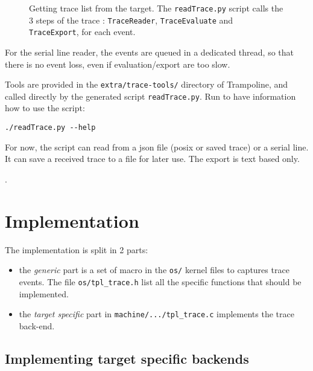 \begin{figure}[htbp]
    \centering
	\begin{adjustbox}{width=.7\linewidth,keepaspectratio}
		
	\end{adjustbox}
	\caption{Getting trace list from the target. The \lstinline{readTrace.py} script calls the 3 steps of the trace : \lstinline{TraceReader}, \lstinline{TraceEvaluate} and \lstinline{TraceExport}, for each event.}
	\label{fig:trace}
\end{figure}

For the serial line reader, the events are queued in a dedicated thread, so that there is no event loss, even if evaluation/export are too slow.


Tools are provided in the \texttt{extra/trace-tools/} directory of Trampoline, and called directly by the generated script \lstinline{readTrace.py}. Run to have information how to use the script:

\begin{lstlisting}
./readTrace.py --help
\end{lstlisting}

For now, the script can read from a json file (posix or saved trace) or a serial line. It can save a received trace to a file for later use. The export is text based only.

.


\section{Implementation}
The implementation is split in 2 parts:
\begin{itemize}
	\item the \emph{generic} part is a set of macro in the \texttt{os/} kernel files to captures trace events. The file \texttt{os/tpl_trace.h} list all the specific functions that should be implemented.
	\item the \emph{target specific} part in \lstinline{machine/.../tpl_trace.c} implements the trace back-end. 
\end{itemize}

\subsection{Implementing target specific backends}
\label{sec:trace:targetbackend}

